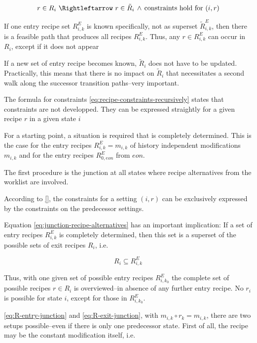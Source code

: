 \documentclass[12pt,a4paper]{scrartcl}
\begin{document}
\begin{equation}
    r\in R_i \,\, \Rightleftarrow\,\, r\in \tilde{R}_i\,\wedge\,\mbox{constraints hold for } (i,r) 
\end{equation}

If one entry recipe set $R^E_{i,k}$ is known specifically, not as superset
$\tilde{R}^E_{i,k}$, then there is a feasible path that produces all recipes
$R^E_{i,k}$. Thus, any $r\in R^E_{i,k}$ can occur in $R_i$, except if it
does not appear 

If a new set of entry recipe becomes known, $\tilde{R}_i$ does not have to be
updated. Practically, this means that there is no impact on $\tilde{R}_i$ that
necessitates a second walk along the successor transition paths--very important.

The formula for constraints \eqref{eq:recipe-constraints-recursively} states
that constraints are not developped. They can be expressed straightly for a
given recipe $r$ in a given state $i$ 

For a starting point, a situation is required that is completely determined.
This is the case for the entry recipes $R^E_{i,k}=m_{i,k}$ of history
independent modifications $m_{i,k}$ and for the entry recipes $R^E_{0,eon}$
from $eon$. 

The first procedure is the junction at all states where recipe alternatives
from the worklist are involved. 

According to \eqref{}, the constraints for a setting $(i,r)$ can be exclusively expressed by the
constraints on the predecessor settings.  

Equation \eqref{eq:junction-recipe-alternatives} has an important implication:
If a set of entry recipes $R^E_{i,k}$ is completely determined, then this set
is a superset of the possible sets of exit recipes $R_i$, i.e.

\begin{equation} \label{eq:pr-subset-junction}
    R_i \subseteq R^E_{i,k} 
\end{equation}

Thus, with one given set of possible entry recipes $R^E_{i,k_0}$ the complete
set of possible recipes $r\in R_i$ is overviewed--in absence of any further
entry recipe. No $r_i$ is possible for state $i$, except for those in
$R^E_{i,k_0}$. 

\ref{eq:R-entry-junction} and \ref{eq:R-exit-junction}, with $m_{i,k}\circ
r_k=m_{i,k}$, there are two setups possible--even if there is only one predecessor
state. First of all, the recipe may be the constant modification itself, i.e.
\end{document}
